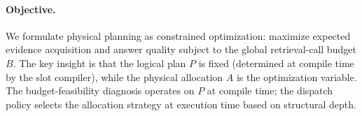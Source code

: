 \paragraph{Objective.}
We formulate physical planning as constrained optimization: maximize expected evidence acquisition and answer quality subject to the global retrieval-call budget $B$. The key insight is that the logical plan $P$ is fixed (determined at compile time by the slot compiler), while the physical allocation $A$ is the optimization variable. The budget-feasibility diagnosis operates on $P$ at compile time; the dispatch policy selects the allocation strategy at execution time based on structural depth.
